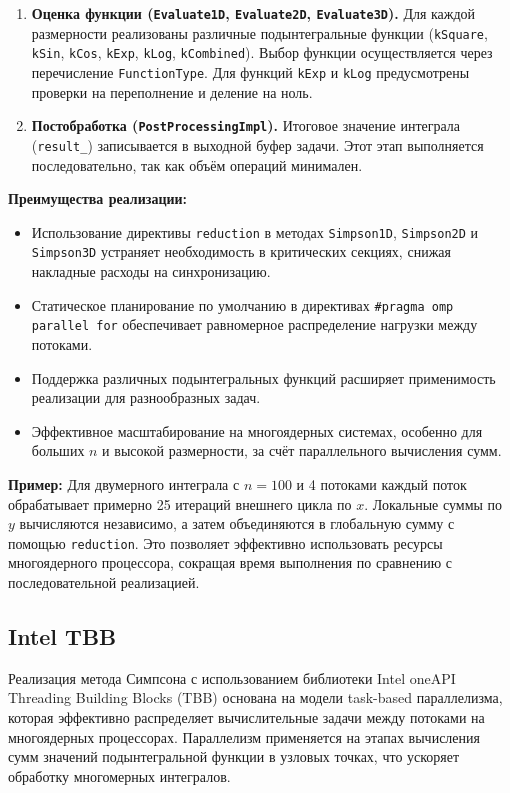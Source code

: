 \documentclass[12pt]{article}
\begin{document}
\begin{enumerate}
  \item \textbf{Оценка функции (\texttt{Evaluate1D}, \texttt{Evaluate2D}, \texttt{Evaluate3D}).}
  Для каждой размерности реализованы различные подынтегральные функции (\texttt{kSquare}, \texttt{kSin}, \texttt{kCos}, \texttt{kExp}, \texttt{kLog}, \texttt{kCombined}). Выбор функции осуществляется через перечисление \texttt{FunctionType}. Для функций \texttt{kExp} и \texttt{kLog} предусмотрены проверки на переполнение и деление на ноль.

  \item \textbf{Постобработка (\texttt{PostProcessingImpl}).}
  Итоговое значение интеграла (\texttt{result\_}) записывается в выходной буфер задачи. Этот этап выполняется последовательно, так как объём операций минимален.
\end{enumerate}

\textbf{Преимущества реализации:}
\begin{itemize}
  \item Использование директивы \texttt{reduction} в методах \texttt{Simpson1D}, \texttt{Simpson2D} и \texttt{Simpson3D} устраняет необходимость в критических секциях, снижая накладные расходы на синхронизацию.
  \item Статическое планирование по умолчанию в директивах \texttt{\#pragma omp parallel for} обеспечивает равномерное распределение нагрузки между потоками.
  \item Поддержка различных подынтегральных функций расширяет применимость реализации для разнообразных задач.
  \item Эффективное масштабирование на многоядерных системах, особенно для больших $n$ и высокой размерности, за счёт параллельного вычисления сумм.
\end{itemize}

\textbf{Пример:}
Для двумерного интеграла с $n = 100$ и 4 потоками каждый поток обрабатывает примерно 25 итераций внешнего цикла по $x$. Локальные суммы по $y$ вычисляются независимо, а затем объединяются в глобальную сумму с помощью \texttt{reduction}. Это позволяет эффективно использовать ресурсы многоядерного процессора, сокращая время выполнения по сравнению с последовательной реализацией.

\subsection{Intel TBB}

Реализация метода Симпсона с использованием библиотеки Intel oneAPI Threading Building Blocks (TBB) основана на модели task-based параллелизма, которая эффективно распределяет вычислительные задачи между потоками на многоядерных процессорах. Параллелизм применяется на этапах вычисления сумм значений подынтегральной функции в узловых точках, что ускоряет обработку многомерных интегралов.
\end{document}
